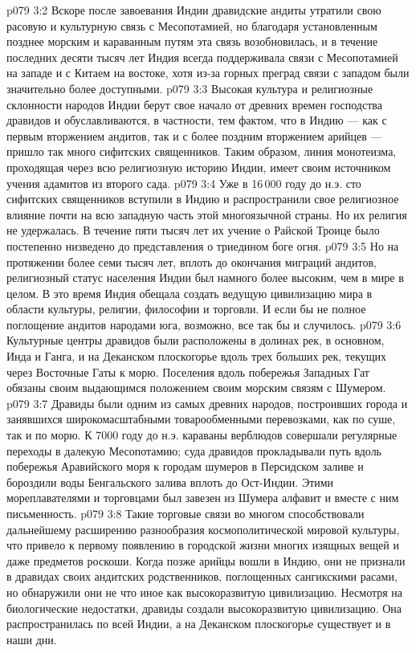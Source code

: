\vs p079 3:2 Вскоре после завоевания Индии дравидские андиты утратили свою расовую и культурную связь с Месопотамией, но благодаря установленным позднее морским и караванным путям эта связь возобновилась, и в течение последних десяти тысяч лет Индия всегда поддерживала связи с Месопотамией на западе и с Китаем на востоке, хотя из\hyp{}за горных преград связи с западом были значительно более доступными.
\vs p079 3:3 \pc Высокая культура и религиозные склонности народов Индии берут свое начало от древних времен господства дравидов и обуславливаются, в частности, тем фактом, что в Индию --- как с первым вторжением андитов, так и с более поздним вторжением арийцев --- пришло так много сифитских священников. Таким образом, линия монотеизма, проходящая через всю религиозную историю Индии, имеет своим источником учения адамитов из второго сада.
\vs p079 3:4 Уже в 16\,000 году до н.э. сто сифитских священников вступили в Индию и распространили свое религиозное влияние почти на всю западную часть этой многоязычной страны. Но их религия не удержалась. В течение пяти тысяч лет их учение о Райской Троице было постепенно низведено до представления о триедином боге огня.
\vs p079 3:5 Но на протяжении более семи тысяч лет, вплоть до окончания миграций андитов, религиозный статус населения Индии был намного более высоким, чем в мире в целом. В это время Индия обещала создать ведущую цивилизацию мира в области культуры, религии, философии и торговли. И если бы не полное поглощение андитов народами юга, возможно, все так бы и случилось.
\vs p079 3:6 \pc Культурные центры дравидов были расположены в долинах рек, в основном, Инда и Ганга, и на Деканском плоскогорье вдоль трех больших рек, текущих через Восточные Гаты к морю. Поселения вдоль побережья Западных Гат обязаны своим выдающимся положением своим морским связям с Шумером.
\vs p079 3:7 Дравиды были одним из самых древних народов, построивших города и занявшихся широкомасштабными товарообменными перевозками, как по суше, так и по морю. К 7000 году до н.э. караваны верблюдов совершали регулярные переходы в далекую Месопотамию; суда дравидов прокладывали путь вдоль побережья Аравийского моря к городам шумеров в Персидском заливе и бороздили воды Бенгальского залива вплоть до Ост\hyp{}Индии. Этими мореплавателями и торговцами был завезен из Шумера алфавит и вместе с ним письменность.
\vs p079 3:8 Такие торговые связи во многом способствовали дальнейшему расширению разнообразия космополитической мировой культуры, что привело к первому появлению в городской жизни многих изящных вещей и даже предметов роскоши. Когда позже арийцы вошли в Индию, они не признали в дравидах своих андитских родственников, поглощенных сангикскими расами, но обнаружили они не что иное как высокоразвитую цивилизацию. Несмотря на биологические недостатки, дравиды создали высокоразвитую цивилизацию. Она распространилась по всей Индии, а на Деканском плоскогорье существует и в наши дни.
